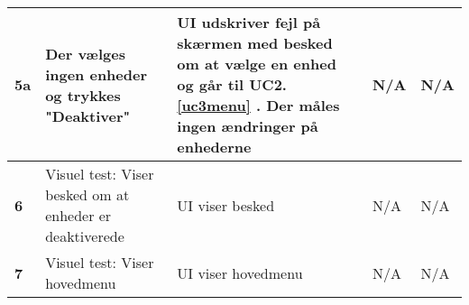 \begin{center}
\begin{longtable}{|p{}|p{}|p{}|p{}|p{}|}
\textbf{5a}			&Der vælges ingen enheder og trykkes "Deaktiver"				
					&UI udskriver fejl på skærmen med besked om at vælge en enhed og går til UC2.\ref{uc3menu}	. 
					 Der måles ingen ændringer på enhederne
					&N/A 
					&N/A \\\hline
		
\textbf{6}			&Visuel test: Viser besked om at enheder er deaktiverede
					&UI viser besked
					&N/A
					&N/A \\\hline
					
\textbf{7}			&Visuel test: Viser hovedmenu
					&UI viser hovedmenu
					&N/A
					&N/A \\\hline
					

	\end{longtable}
	\label{ATUC3} 
\end{center}